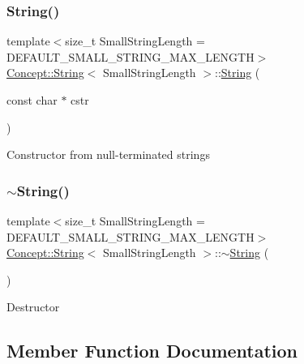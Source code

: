 \subsubsection{\texorpdfstring{String()}{String()}\hspace{0.1cm}{\footnotesize\ttfamily [4/4]}}
{\footnotesize\ttfamily template$<$size\+\_\+t Small\+String\+Length = D\+E\+F\+A\+U\+L\+T\+\_\+\+S\+M\+A\+L\+L\+\_\+\+S\+T\+R\+I\+N\+G\+\_\+\+M\+A\+X\+\_\+\+L\+E\+N\+G\+TH$>$ \\
\mbox{\hyperlink{class_concept_1_1_string}{Concept\+::\+String}}$<$ Small\+String\+Length $>$\+::\mbox{\hyperlink{class_concept_1_1_string}{String}} (\begin{DoxyParamCaption}\item[{const char $\ast$}]{cstr }\end{DoxyParamCaption})\hspace{0.3cm}{\ttfamily [inline]}}

Constructor from null-\/terminated strings \mbox{\label{class_concept_1_1_string_a4ad5e8d6735b8990ef70997068661056}} 
\subsubsection{\texorpdfstring{$\sim$String()}{~String()}}
{\footnotesize\ttfamily template$<$size\+\_\+t Small\+String\+Length = D\+E\+F\+A\+U\+L\+T\+\_\+\+S\+M\+A\+L\+L\+\_\+\+S\+T\+R\+I\+N\+G\+\_\+\+M\+A\+X\+\_\+\+L\+E\+N\+G\+TH$>$ \\
\mbox{\hyperlink{class_concept_1_1_string}{Concept\+::\+String}}$<$ Small\+String\+Length $>$\+::$\sim$\mbox{\hyperlink{class_concept_1_1_string}{String}} (\begin{DoxyParamCaption}{ }\end{DoxyParamCaption})\hspace{0.3cm}{\ttfamily [inline]}}

Destructor 

\subsection{Member Function Documentation}
\mbox{\label{class_concept_1_1_string_ae7fb4fa9bc119158939fea1ff0496e02}} 
